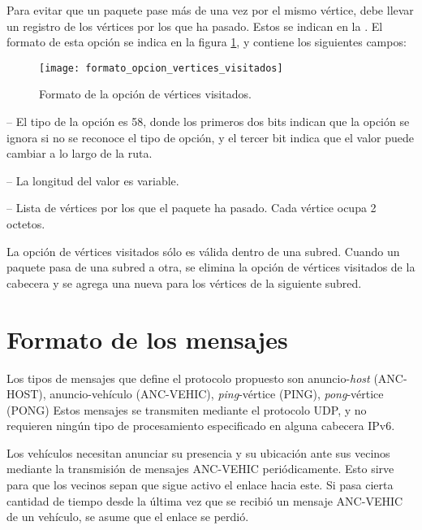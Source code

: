 \label{subsec:opcion_de_vertices_visitados}

Para evitar que un paquete pase más de una vez por el mismo vértice, debe
llevar un registro de los vértices por los que ha pasado. Estos se indican en
la . El formato de esta opción se indica
en la figura \ref{fig:formato_opcion_vertices_visitados}, y contiene los
siguientes campos:

\begin{figure}[th!]
\centering
\texttt{[image: formato\_opcion\_vertices\_visitados]}
\decoRule
\caption[Formato de la opción de vértices visitados]{Formato de la opción de
vértices visitados.}
\label{fig:formato_opcion_vertices_visitados}
\end{figure}

 -- El tipo de la opción es 58, donde los primeros dos
bits indican que la opción se ignora si no se reconoce el tipo de opción, y el
tercer bit indica que el valor puede cambiar a lo largo de la ruta.

 -- La longitud del valor es variable.

 -- Lista de vértices por los
que el paquete ha pasado. Cada vértice ocupa 2 octetos.

La opción de vértices visitados sólo es válida dentro de una subred. Cuando un
paquete pasa de una subred a otra, se elimina la opción de vértices visitados
de la cabecera y se agrega una nueva para los vértices de la siguiente subred.

\section{Formato de los mensajes}

\label{sec:formato_mensajes}

Los tipos de mensajes que define el protocolo propuesto son
anuncio-\textit{host} (ANC-HOST), anuncio-vehículo (ANC-VEHIC),
\textit{ping}-vértice (PING), \textit{pong}-vértice (PONG) Estos mensajes se
transmiten mediante el protocolo UDP, y no requieren ningún tipo de
procesamiento especificado en alguna cabecera IPv6.

Los vehículos necesitan anunciar su presencia y su ubicación ante sus vecinos
mediante la transmisión de mensajes ANC-VEHIC periódicamente. Esto sirve para
que los vecinos sepan que sigue activo el enlace hacia este. Si pasa cierta
cantidad de tiempo desde la última vez que se recibió un mensaje ANC-VEHIC de
un vehículo, se asume que el enlace se perdió.

